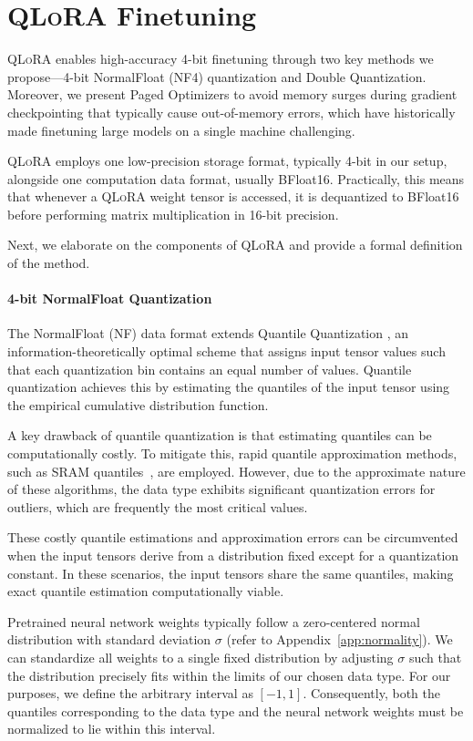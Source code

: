 \section{\textsc{QLoRA} Finetuning}

\textsc{QLoRA} enables high-accuracy 4-bit finetuning through two key methods we propose—4-bit NormalFloat (NF4) quantization and Double Quantization. Moreover, we present Paged Optimizers to avoid memory surges during gradient checkpointing that typically cause out-of-memory errors, which have historically made finetuning large models on a single machine challenging.

\textsc{QLoRA} employs one low-precision storage format, typically 4-bit in our setup, alongside one computation data format, usually BFloat16. Practically, this means that whenever a \textsc{QLoRA} weight tensor is accessed, it is dequantized to BFloat16 before performing matrix multiplication in 16-bit precision.

Next, we elaborate on the components of \textsc{QLoRA} and provide a formal definition of the method.

\paragraph{4-bit NormalFloat Quantization} The NormalFloat (NF) data format extends Quantile Quantization \citep{dettmers2022optimizers}, an information-theoretically optimal scheme that assigns input tensor values such that each quantization bin contains an equal number of values. Quantile quantization achieves this by estimating the quantiles of the input tensor using the empirical cumulative distribution function.

A key drawback of quantile quantization is that estimating quantiles can be computationally costly. To mitigate this, rapid quantile approximation methods, such as SRAM quantiles~\citep{dettmers2022optimizers}, are employed. However, due to the approximate nature of these algorithms, the data type exhibits significant quantization errors for outliers, which are frequently the most critical values.

These costly quantile estimations and approximation errors can be circumvented when the input tensors derive from a distribution fixed except for a quantization constant. In these scenarios, the input tensors share the same quantiles, making exact quantile estimation computationally viable.

Pretrained neural network weights typically follow a zero-centered normal distribution with standard deviation $\sigma$ (refer to Appendix~\ref{app:normality}). We can standardize all weights to a single fixed distribution by adjusting $\sigma$ such that the distribution precisely fits within the limits of our chosen data type. For our purposes, we define the arbitrary interval as $[-1, 1]$. Consequently, both the quantiles corresponding to the data type and the neural network weights must be normalized to lie within this interval.

